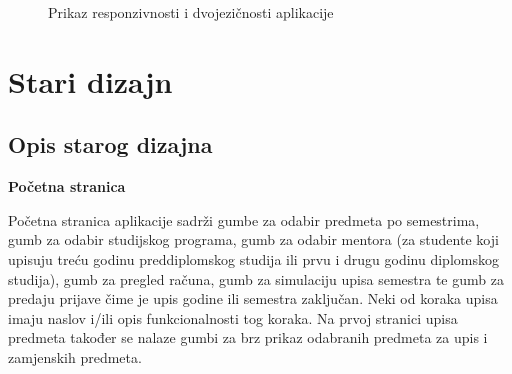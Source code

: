 \documentclass[times, utf8, zavrsni, numeric]{fer}
\begin{document}
    \begin{figure} [H]
      \centering
      \caption{Prikaz responzivnosti i dvojezičnosti aplikacije}
    \end{figure}
    
    \section{Stari dizajn}
        \subsection{Opis starog dizajna}
        \textbf{Početna stranica}
        
        Početna stranica aplikacije sadrži gumbe za odabir predmeta po semestrima, gumb za odabir studijskog programa, gumb za odabir mentora (za studente koji upisuju treću godinu preddiplomskog studija ili prvu i drugu godinu diplomskog studija), gumb za pregled računa, gumb za simulaciju upisa semestra te gumb za predaju prijave čime je upis godine ili semestra zaključan. Neki od koraka upisa imaju naslov i/ili opis funkcionalnosti tog koraka. Na prvoj stranici upisa predmeta također se nalaze gumbi za brz prikaz odabranih predmeta za upis i zamjenskih predmeta.
        
\end{document}
